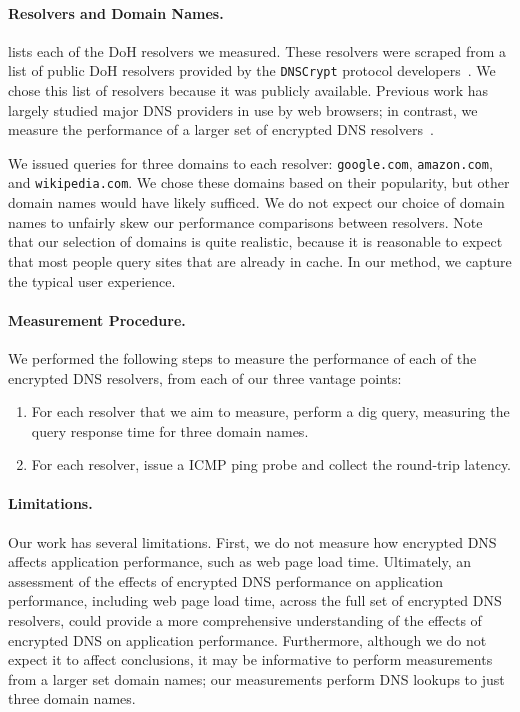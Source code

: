 \paragraph{Resolvers and Domain Names.}  lists each of 
the DoH resolvers we measured.  These resolvers were
scraped from a list of public DoH resolvers provided by the \texttt{DNSCrypt}
protocol developers~\cite{dnscrypt-public-resolvers}.
We chose this list of resolvers because it was publicly available.
Previous work has largely studied major DNS providers in use by web browsers; in contrast, we
measure the performance of a larger set of encrypted DNS resolvers~\cite{hounsel2020comparing,hounsel2021can,hoang2020k,lu2019end-to-end}.

We issued queries for three domains to each resolver: \texttt{google.com}, 
\texttt{amazon.com}, and \texttt{wikipedia.com}.  We chose these domains based on their popularity, but
other domain names would have likely sufficed.  We do not expect our choice of
domain names to unfairly skew our performance comparisons between resolvers. Note that our selection of domains is quite realistic, because it is reasonable to expect that most people query sites that are already in cache. In our method, we capture the typical user experience.

\paragraph{Measurement Procedure.} We performed the following steps to measure
the performance of each of the encrypted DNS resolvers, from each of our three vantage points:
\begin{enumerate} 
        \item For each resolver that we aim to measure, perform a dig query, measuring the query response time for three
            domain names.
    \item For each resolver, issue a ICMP ping
            probe and collect the round-trip latency. 
\end{enumerate}

\paragraph{Limitations.} Our work has several limitations.
First, we do not measure how encrypted DNS affects application
performance, such as web page load time. Ultimately, an assessment of the
effects of encrypted DNS performance on application performance, including web
page load time, across the full set of encrypted DNS resolvers, could provide
a more comprehensive understanding of the effects of encrypted DNS on
application performance. Furthermore, although we do not expect it to affect conclusions, it may
be informative to perform measurements from a larger set domain names; our
measurements perform DNS lookups to just three domain names.

